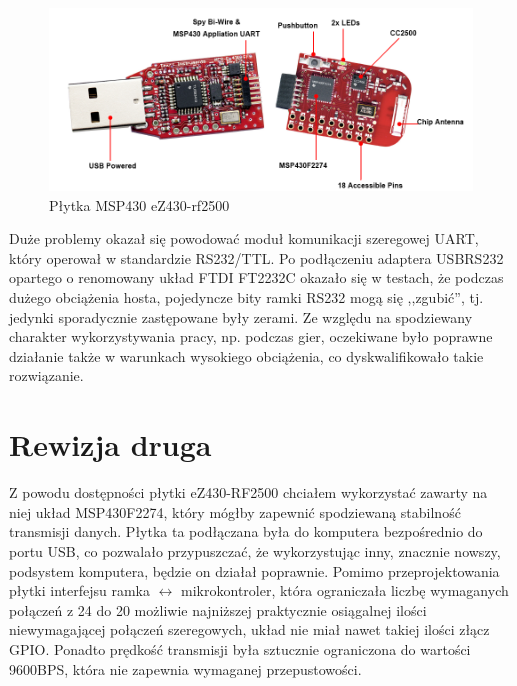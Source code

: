 \begin{figure}
 \centering
 \includegraphics[width=\textwidth]{gfx/ez430-rf2500}
 \caption{Płytka MSP430 eZ430-rf2500}
 \label{fig:msp430_ez430}
\end{figure}

Duże problemy okazał się powodować moduł komunikacji szeregowej UART, który operował w standardzie RS232/TTL.
Po podłączeniu adaptera USB\ppauza{}RS232 opartego o renomowany układ FTDI FT2232C okazało się w testach, że podczas dużego obciążenia hosta, pojedyncze bity ramki RS232 mogą się ,,zgubić'', tj. jedynki sporadycznie zastępowane były zerami.
Ze względu na spodziewany charakter wykorzystywania pracy, np. podczas gier, oczekiwane było poprawne działanie także w warunkach wysokiego obciążenia, co dyskwalifikowało takie rozwiązanie.\\

\section{Rewizja druga}

Z powodu dostępności płytki eZ430-RF2500 chciałem wykorzystać zawarty na niej układ MSP430F2274, który mógłby zapewnić spodziewaną stabilność transmisji danych.
Płytka ta podłączana była do komputera bezpośrednio do portu USB, co pozwalało przypuszczać, że wykorzystując inny, znacznie nowszy, podsystem komputera, będzie on działał poprawnie.
Pomimo przeprojektowania płytki interfejsu ramka $\leftrightarrow$ mikrokontroler, która ograniczała liczbę wymaganych połączeń z 24 do 20 \pauza możliwie najniższej praktycznie osiągalnej ilości niewymagającej połączeń szeregowych, układ nie miał nawet takiej ilości złącz GPIO.
Ponadto prędkość transmisji była sztucznie ograniczona do wartości 9600BPS, która nie zapewnia wymaganej przepustowości.

